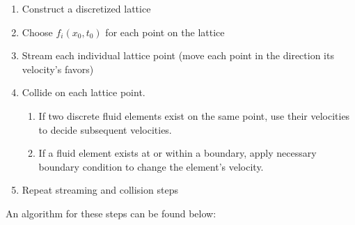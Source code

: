 \documentclass[twoside]{article}
\begin{document}
\begin{enumerate}
\setlength{\itemsep}{10pt}
\item Construct a discretized lattice
\item Choose \(f_i(x_0, t_0)\) for each point on the lattice
\item Stream each individual lattice point (move each point in the direction its velocity's favors)
\item Collide on each lattice point.
\begin{enumerate}
\item If two discrete fluid elements exist on the same point, use their velocities to decide subsequent velocities.
\item If a fluid element exists at or within a boundary, apply necessary boundary condition to change the element's velocity.
\end{enumerate}
\item Repeat streaming and collision steps
\end{enumerate}


\noindent An algorithm for these steps can be found below:\\

\newpage
\end{document}
